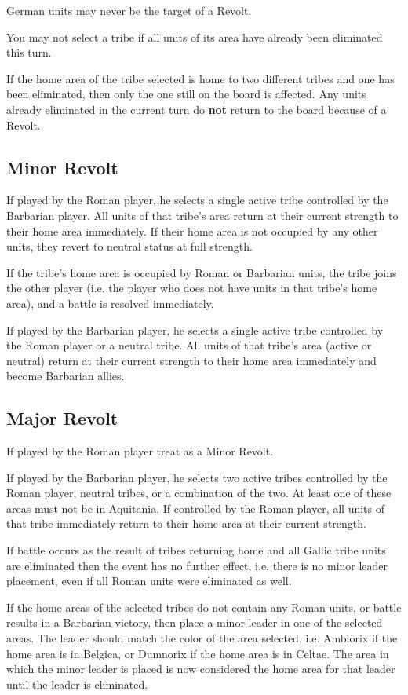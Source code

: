 German units may never be the target of a Revolt.

You may not select a tribe if all units of its area have already been eliminated this turn.

If the home area of the tribe selected is home to two different tribes and one has been eliminated, then only the one still on the board is affected. Any units already eliminated in the current turn do \textbf{not} return to the board because of a Revolt.

\subsection{Minor Revolt}
If played by the Roman player, he selects a single active tribe controlled
by the Barbarian player. All units of that tribe's area return at their current strength to their home area immediately. If their home area is not occupied by any other units, they revert to neutral status at full strength.

If the tribe’s home area is occupied by Roman or Barbarian units, the tribe joins the other player (i.e. the player who does not have units in that tribe’s home area), and a battle is resolved immediately.

If played by the Barbarian player, he selects a single active tribe
controlled by the Roman player or a neutral tribe. All units of that
tribe's area (active or neutral) return at their current strength to their home area immediately and become Barbarian allies.

\subsection{Major Revolt}
If played by the Roman player treat as a Minor Revolt.

If played by the Barbarian player, he selects two active tribes controlled by the Roman player, neutral tribes, or a combination of the two. At least one of these areas must not be in Aquitania. If controlled by the Roman player, all units of that tribe immediately return to their home area at their current strength.

If battle occurs as the result of tribes returning home and all Gallic tribe units are eliminated then the event has no further effect, i.e. there is no minor leader placement, even if all Roman units were eliminated as well.

If the home areas of the selected tribes do not contain any Roman units, or battle results in a Barbarian victory, then place a minor leader in one of the selected areas. The leader should match the color of the area selected, i.e. Ambiorix if the home area is in Belgica, or Dumnorix if the home area is in Celtae. The area in which the minor leader is placed is now considered the home area for that leader until the leader is eliminated.


